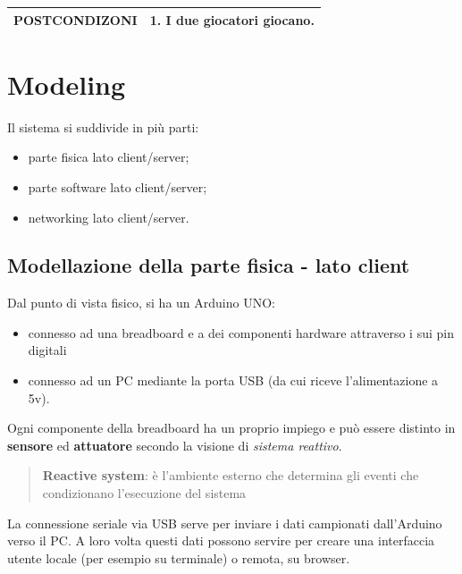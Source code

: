\begin{table}[]
\begin{tabular}{ll}
		\multicolumn{1}{|l|}{\textbf{POSTCONDIZONI}}         & \multicolumn{1}{l|}{1. I due giocatori giocano.}                                                                                                                                                                                                                                                                                                                                                                                                                                                                                                                                     \\ \hline
	\end{tabular}
\end{table}

\newpage
\section{Modeling}
Il sistema si suddivide in più parti:
\begin{itemize}
	\item parte fisica lato client/server;
	\item parte software lato client/server;
	\item networking lato client/server.
\end{itemize}

\subsection{Modellazione della parte fisica - lato client}
Dal punto di vista fisico, si ha un Arduino UNO:
\begin{itemize}
	\item connesso ad una breadboard e a dei componenti hardware attraverso i sui pin digitali
	\item connesso ad un PC mediante la porta USB (da cui riceve l'alimentazione a 5v). 
\end{itemize}
Ogni componente della breadboard ha un proprio impiego e può essere distinto in \textbf{sensore} ed \textbf{attuatore} secondo la visione di \textit{sistema reattivo}.

	\begin{quote}
		\textbf{Reactive system}: è l’ambiente esterno che determina gli eventi che	condizionano l’esecuzione del sistema
	\end{quote}	
La connessione seriale via USB serve per inviare i dati campionati dall'Arduino verso il PC. A loro volta questi dati possono servire per creare una interfaccia utente locale (per esempio su terminale) o remota, su browser.

